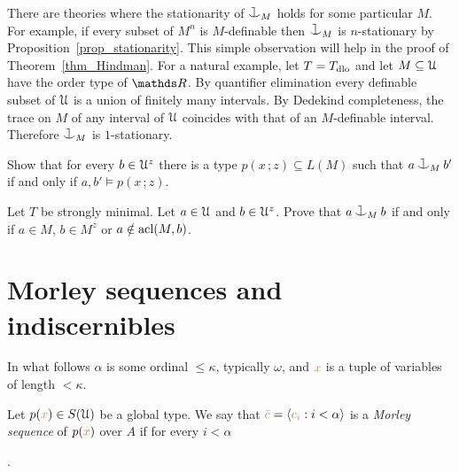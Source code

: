 \begin{remark}\label{rk_coheir_stationary}
There are theories where the stationarity of $\cnonfork_M$ holds for some particular $M$.
For example, if every subset of $M^n$ is $M$-definable then $\cnonfork_M$ is $n$-stationary by Proposition~\ref{prop_stationarity}.
This simple observation will help in the proof of Theorem~\ref{thm_Hindman}.
For a natural example, let $T=T_{\rm dlo}$ and let $M\subseteq\EuScript U$ have the order type of $\RR$.
By quantifier elimination every definable subset of $\EuScript U$ is a union of finitely many intervals.
By Dedekind completeness, the trace on $M$ of any interval of $\EuScript U$ coincides with that of an $M$-definable interval.
Therefore $\cnonfork_M$ is $1$-stationary.
\end{remark}

\begin{exercise}\label{ex_heir_type}
  Show that for every $b\in\EuScript U^z$ there is a type $p(x\,;z)\subseteq L(M)$ such that $a\cnonfork_M b'$ if and only if $a,b'\models p(x\,;z)$.
\end{exercise}

\begin{exercise}
  Let $T$ be strongly minimal.
  Let $a\in\EuScript U$ and $b\in\EuScript U^z$.
  Prove that $a\cnonfork_Mb$ if and only if $a\in M$, $b\in M^z$ or $a\notin{\rm acl}(M,b)$.
\end{exercise}

\section{Morley sequences and indiscernibles}

In what follows $\alpha$ is some ordinal $\le\kappa$, typically $\omega$, and ${\color{brown} x}$ is a tuple of variables of length $<\kappa$.

Let \mbox{$p({\color{brown} x})\in S(\EuScript U)$} be a global type.
We say that ${\color{brown}\bar c}=\langle{\color{brown}c_i}:i<\alpha\rangle$ is a \emph{Morley sequence\/} of $p({\color{brown} x})$ over $A$ if for every $i<\alpha$

.

